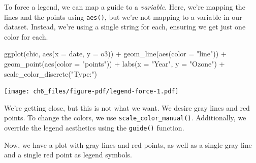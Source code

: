 \documentclass[
  letterpaper,
]{scrbook}
\newenvironment{Shaded}{\begin{snugshade}}{\end{snugshade}}
\newcommand{\AttributeTok}[1]{\textcolor[rgb]{0.40,0.45,0.13}{#1}}
\newcommand{\FunctionTok}[1]{\textcolor[rgb]{0.28,0.35,0.67}{#1}}
\newcommand{\NormalTok}[1]{\textcolor[rgb]{0.00,0.23,0.31}{#1}}
\newcommand{\SpecialCharTok}[1]{\textcolor[rgb]{0.37,0.37,0.37}{#1}}
\newcommand{\StringTok}[1]{\textcolor[rgb]{0.13,0.47,0.30}{#1}}
\begin{document}
To force a legend, we can map a guide to a \emph{variable}. Here, we're
mapping the lines and the points using \texttt{aes()}, but we're not
mapping to a variable in our dataset. Instead, we're using a single
string for each, ensuring we get just one color for each.

\begin{Shaded}
\begin{Highlighting}[]
\FunctionTok{ggplot}\NormalTok{(chic, }\FunctionTok{aes}\NormalTok{(}\AttributeTok{x =}\NormalTok{ date, }\AttributeTok{y =}\NormalTok{ o3)) }\SpecialCharTok{+}
  \FunctionTok{geom\_line}\NormalTok{(}\FunctionTok{aes}\NormalTok{(}\AttributeTok{color =} \StringTok{"line"}\NormalTok{)) }\SpecialCharTok{+}
  \FunctionTok{geom\_point}\NormalTok{(}\FunctionTok{aes}\NormalTok{(}\AttributeTok{color =} \StringTok{"points"}\NormalTok{)) }\SpecialCharTok{+}
  \FunctionTok{labs}\NormalTok{(}\AttributeTok{x =} \StringTok{"Year"}\NormalTok{, }\AttributeTok{y =} \StringTok{"Ozone"}\NormalTok{) }\SpecialCharTok{+}
  \FunctionTok{scale\_color\_discrete}\NormalTok{(}\StringTok{"Type:"}\NormalTok{)}
\end{Highlighting}
\end{Shaded}

\texttt{[image: ch6\_files/figure-pdf/legend-force-1.pdf]}

We're getting close, but this is not what we want. We desire gray lines
and red points. To change the colors, we use
\texttt{scale\_color\_manual()}. Additionally, we override the legend
aesthetics using the \texttt{guide()} function.

Now, we have a plot with gray lines and red points, as well as a single
gray line and a single red point as legend symbols.
\end{document}
